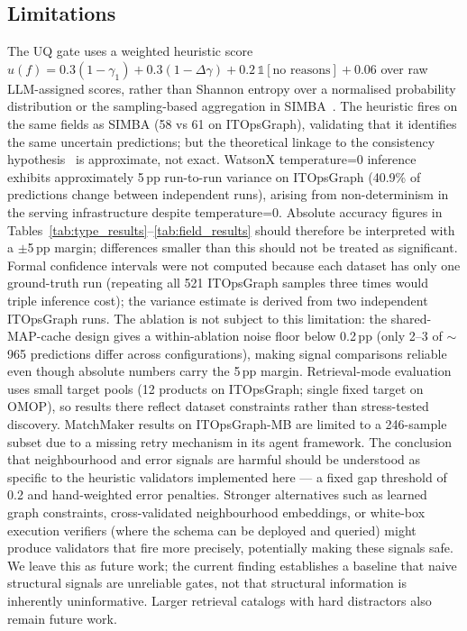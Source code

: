 \documentclass[sigconf, nonacm]{acmart}
\begin{document}
\subsection{Limitations}

The UQ gate uses a weighted heuristic score $u(f) = 0.3(1-\gamma_1) + 0.3(1-\Delta\gamma) + 0.2\,\mathbb{1}[\text{no reasons}] + 0.06$ over raw LLM-assigned scores, rather than Shannon entropy over a normalised probability distribution or the sampling-based aggregation in SIMBA~\cite{simba2025}. The heuristic fires on the same fields as SIMBA (58 vs 61 on ITOpsGraph), validating that it identifies the same uncertain predictions; but the theoretical linkage to the consistency hypothesis~\cite{xiao2025consistency} is approximate, not exact. WatsonX temperature=0 inference exhibits approximately 5\,pp run-to-run variance on ITOpsGraph (40.9\% of predictions change between independent runs), arising from non-determinism in the serving infrastructure despite temperature=0. Absolute accuracy figures in Tables~\ref{tab:type_results}--\ref{tab:field_results} should therefore be interpreted with a $\pm$5\,pp margin; differences smaller than this should not be treated as significant. Formal confidence intervals were not computed because each dataset has only one ground-truth run (repeating all 521 ITOpsGraph samples three times would triple inference cost); the variance estimate is derived from two independent ITOpsGraph runs. The ablation is not subject to this limitation: the shared-MAP-cache design gives a within-ablation noise floor below 0.2\,pp (only 2--3 of $\sim$965 predictions differ across configurations), making signal comparisons reliable even though absolute numbers carry the 5\,pp margin. Retrieval-mode evaluation uses small target pools (12 products on ITOpsGraph; single fixed target on OMOP), so results there reflect dataset constraints rather than stress-tested discovery. MatchMaker results on ITOpsGraph-MB are limited to a 246-sample subset due to a missing retry mechanism in its agent framework. The conclusion that neighbourhood and error signals are harmful should be understood as specific to the heuristic validators implemented here — a fixed gap threshold of 0.2 and hand-weighted error penalties. Stronger alternatives such as learned graph constraints, cross-validated neighbourhood embeddings, or white-box execution verifiers (where the schema can be deployed and queried) might produce validators that fire more precisely, potentially making these signals safe. We leave this as future work; the current finding establishes a baseline that naive structural signals are unreliable gates, not that structural information is inherently uninformative. Larger retrieval catalogs with hard distractors also remain future work.
\end{document}
